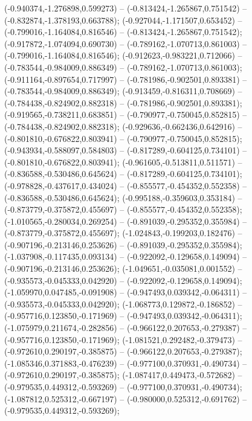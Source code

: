  (-0.940374,-1.276898,0.599273) -- (-0.813424,-1.265867,0.751542) -- (-0.832874,-1.378193,0.663788);
 (-0.927044,-1.171507,0.653452) -- (-0.799016,-1.164084,0.816546) -- (-0.813424,-1.265867,0.751542);
 (-0.917872,-1.074094,0.690730) -- (-0.789162,-1.070713,0.861003) -- (-0.799016,-1.164084,0.816546);
 (-0.912623,-0.983221,0.712066) -- (-0.783544,-0.984009,0.886349) -- (-0.789162,-1.070713,0.861003);
 (-0.911164,-0.897654,0.717997) -- (-0.781986,-0.902501,0.893381) -- (-0.783544,-0.984009,0.886349);
 (-0.913459,-0.816311,0.708669) -- (-0.784438,-0.824902,0.882318) -- (-0.781986,-0.902501,0.893381);
 (-0.919565,-0.738211,0.683851) -- (-0.790977,-0.750045,0.852815) -- (-0.784438,-0.824902,0.882318);
 (-0.929636,-0.662436,0.642916) -- (-0.801810,-0.676822,0.803941) -- (-0.790977,-0.750045,0.852815);
 (-0.943934,-0.588097,0.584803) -- (-0.817289,-0.604125,0.734101) -- (-0.801810,-0.676822,0.803941);
 (-0.961605,-0.513811,0.511571) -- (-0.836588,-0.530486,0.645624) -- (-0.817289,-0.604125,0.734101);
 (-0.978828,-0.437617,0.434024) -- (-0.855577,-0.454352,0.552358) -- (-0.836588,-0.530486,0.645624);
 (-0.995188,-0.359603,0.353184) -- (-0.873779,-0.375872,0.455697) -- (-0.855577,-0.454352,0.552358);
 (-1.010565,-0.280034,0.269254) -- (-0.891039,-0.295352,0.355984) -- (-0.873779,-0.375872,0.455697);
 (-1.024843,-0.199203,0.182476) -- (-0.907196,-0.213146,0.253626) -- (-0.891039,-0.295352,0.355984);
 (-1.037908,-0.117435,0.093134) -- (-0.922092,-0.129658,0.149094) -- (-0.907196,-0.213146,0.253626);
 (-1.049651,-0.035081,0.001552) -- (-0.935573,-0.045333,0.042920) -- (-0.922092,-0.129658,0.149094);
 (-1.059970,0.047485,-0.091908) -- (-0.947493,0.039342,-0.064311) -- (-0.935573,-0.045333,0.042920);
 (-1.068773,0.129872,-0.186852) -- (-0.957716,0.123850,-0.171969) -- (-0.947493,0.039342,-0.064311);
 (-1.075979,0.211674,-0.282856) -- (-0.966122,0.207653,-0.279387) -- (-0.957716,0.123850,-0.171969);
 (-1.081521,0.292482,-0.379473) -- (-0.972610,0.290197,-0.385875) -- (-0.966122,0.207653,-0.279387);
 (-1.085346,0.371883,-0.476239) -- (-0.977100,0.370931,-0.490734) -- (-0.972610,0.290197,-0.385875);
 (-1.087417,0.449473,-0.572682) -- (-0.979535,0.449312,-0.593269) -- (-0.977100,0.370931,-0.490734);
 (-1.087812,0.525312,-0.667197) -- (-0.980000,0.525312,-0.691762) -- (-0.979535,0.449312,-0.593269);
